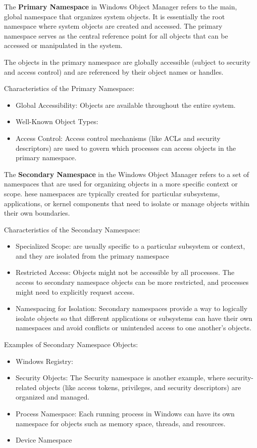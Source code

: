The {\bf Primary Namespace} in Windows Object Manager refers to the main, global namespace that organizes system objects. It is essentially the root namespace where system objects are created and accessed. The primary namespace serves as the central reference point for all objects that can be accessed or manipulated in the system.

The objects in the primary namespace are globally accessible (subject to security and access control) and are referenced by their object names or handles.

Characteristics of the Primary Namespace:
\begin{itemize}
    \item Global Accessibility: Objects are available throughout the entire system.
    \item Well-Known Object Types: 
    \item Access Control: Access control mechanisms (like ACLs and security descriptors) are used to govern which processes can access objects in the primary namespace.
\end{itemize}

The {\bf Secondary Namespace} in the Windows Object Manager refers to a set of namespaces that are used for organizing objects in a more specific context or scope. hese namespaces are typically created for particular subsystems, applications, or kernel components that need to isolate or manage objects within their own boundaries.



Characteristics of the Secondary Namespace:
\begin{itemize}
    \item Specialized Scope: are usually specific to a particular subsystem or context, and they are isolated from the primary namespace
    \item Restricted Access: Objects might not be accessible by all processes. The access to secondary namespace objects can be more restricted, and processes might need to explicitly request access.
    \item Namespacing for Isolation: Secondary namespaces provide a way to logically isolate objects so that different applications or subsystems can have their own namespaces and avoid conflicts or unintended access to one another’s objects.
\end{itemize}


Examples of Secondary Namespace Objects:
\begin{itemize}
    \item Windows Registry:
    \item Security Objects: The Security namespace is another example, where security-related objects (like access tokens, privileges, and security descriptors) are organized and managed.
    \item Process Namespace: Each running process in Windows can have its own namespace for objects such as memory space, threads, and resources.
    \item Device Namespace
\end{itemize}

